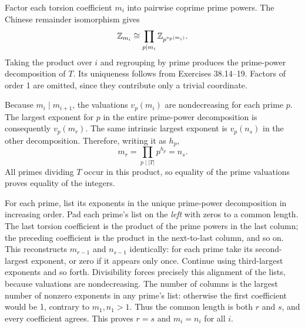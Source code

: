 Factor each torsion coefficient $m_i$ into pairwise coprime prime powers. The Chinese remainder isomorphism gives
\[
\mathbb{Z}_{m_i}\cong\prod_{p\mid m_i}\mathbb{Z}_{p^{v_p(m_i)}}.
\]
Taking the product over $i$ and regrouping by prime produces the prime-power decomposition of $T$. Its uniqueness follows from Exercises 38.14--19. Factors of order 1 are omitted, since they contribute only a trivial coordinate.

Because $m_i\mid m_{i+1}$, the valuations $v_p(m_i)$ are nondecreasing for each prime $p$. The largest exponent for $p$ in the entire prime-power decomposition is consequently $v_p(m_r)$.
The same intrinsic largest exponent is $v_p(n_s)$ in the other decomposition. Therefore, writing it as $h_p$,
\[
m_r=\prod_{p\mid|T|}p^{h_p}=n_s.
\]
All primes dividing $T$ occur in this product, so equality of the prime valuations proves equality of the integers.

For each prime, list its exponents in the unique prime-power decomposition in increasing order. Pad each prime's list on the \emph{left} with zeros to a common length. The last torsion coefficient is the product of the prime powers in the last column; the preceding coefficient is the product in the next-to-last column, and so on.
This reconstructs $m_{r-1}$ and $n_{s-1}$ identically: for each prime take its second-largest exponent, or zero if it appears only once. Continue using third-largest exponents and so forth. Divisibility forces precisely this alignment of the lists, because valuations are nondecreasing.
The number of columns is the largest number of nonzero exponents in any prime's list: otherwise the first coefficient would be 1, contrary to $m_1,n_1>1$. Thus the common length is both $r$ and $s$, and every coefficient agrees. This proves $r=s$ and $m_i=n_i$ for all $i$.
